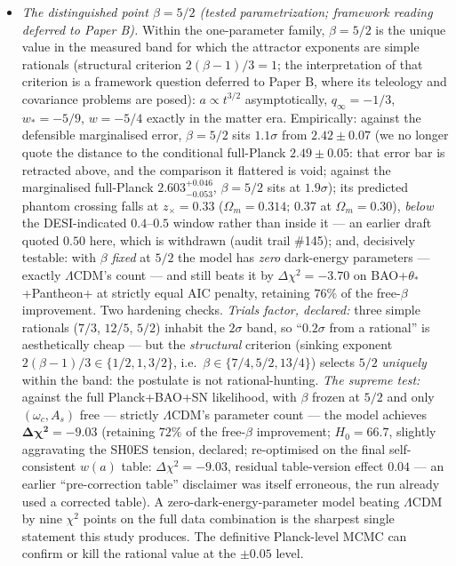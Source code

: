 \documentclass[11pt]{article}
\begin{document}
\begin{itemize}
\item[P10.] \emph{The distinguished point $\beta = 5/2$ (tested parametrization; framework reading deferred to Paper B).} Within the one-parameter family, $\beta = 5/2$ is the unique value in the measured band for which the attractor exponents are simple rationals (structural criterion $2(\beta-1)/3 = 1$; the interpretation of that criterion is a framework question deferred to Paper B, where its teleology and covariance problems are posed): $a \propto t^{3/2}$ asymptotically, $q_\infty = -1/3$, $w_* = -5/9$, $w = -5/4$ exactly in the matter era. Empirically: against the defensible marginalised error, $\beta = 5/2$ sits $1.1\sigma$ from $2.42 \pm 0.07$ (we no longer quote the distance to the conditional full-Planck $2.49 \pm 0.05$: that error bar is retracted above, and the comparison it flattered is void; against the marginalised full-Planck $2.603^{+0.046}_{-0.053}$, $\beta = 5/2$ sits at $1.9\sigma$); its predicted phantom crossing falls at $z_\times = 0.33$ ($\Omega_m = 0.314$; $0.37$ at $\Omega_m = 0.30$), \emph{below} the DESI-indicated $0.4$--$0.5$ window rather than inside it --- an earlier draft quoted $0.50$ here, which is withdrawn (audit trail \#145); and, decisively testable: with $\beta$ \emph{fixed} at $5/2$ the model has \emph{zero} dark-energy parameters --- exactly $\Lambda$CDM's count --- and still beats it by $\Delta\chi^2 = -3.70$ on BAO+$\theta_*$+Pantheon+ at strictly equal AIC penalty, retaining $76\%$ of the free-$\beta$ improvement. Two hardening checks. \emph{Trials factor, declared:} three simple rationals ($7/3$, $12/5$, $5/2$) inhabit the $2\sigma$ band, so ``$0.2\sigma$ from a rational'' is aesthetically cheap --- but the \emph{structural} criterion (sinking exponent $2(\beta-1)/3 \in \{1/2, 1, 3/2\}$, i.e.\ $\beta \in \{7/4, 5/2, 13/4\}$) selects $5/2$ \emph{uniquely} within the band: the postulate is not rational-hunting. \emph{The supreme test:} against the full Planck+BAO+SN likelihood, with $\beta$ frozen at $5/2$ and only $(\omega_c, A_s)$ free --- strictly $\Lambda$CDM's parameter count --- the model achieves $\boldsymbol{\Delta\chi^2 = -9.03}$ (retaining $72\%$ of the free-$\beta$ improvement; $H_0 = 66.7$, slightly aggravating the SH0ES tension, declared; re-optimised on the final self-consistent $w(a)$ table: $\Delta\chi^2 = -9.03$, residual table-version effect $0.04$ --- an earlier ``pre-correction table'' disclaimer was itself erroneous, the run already used a corrected table). A zero-dark-energy-parameter model beating $\Lambda$CDM by nine $\chi^2$ points on the full data combination is the sharpest single statement this study produces. The definitive Planck-level MCMC can confirm or kill the rational value at the $\pm 0.05$ level.
\end{itemize}
\end{document}
